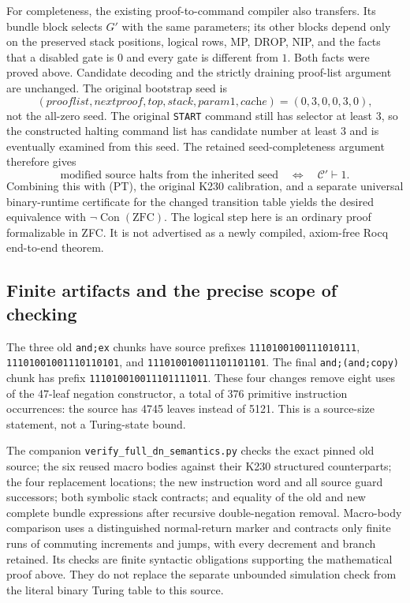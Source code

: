 For completeness, the existing proof-to-command compiler also
transfers.  Its bundle block selects $G'$ with the same parameters;
its other blocks depend only on the preserved stack positions,
logical rows, MP, DROP, NIP, and the facts that a disabled gate is
$0$ and every gate is different from $1$.  Both facts were proved
above.  Candidate decoding and the strictly draining proof-list
argument are unchanged.  The original bootstrap seed is
\[
 (\textit{prooflist},\textit{nextproof},\textit{top},
   \textit{stack},\textit{param1},\textit{cache})
       =(0,3,0,0,3,0),
\]
not the all-zero seed.  The original \texttt{START} command still
has selector at least $3$, so the constructed halting command list
has candidate number at least $3$ and is eventually examined from
this seed.  The retained seed-completeness argument therefore gives
\[
 \text{modified source halts from the inherited seed}
 \quad\Longleftrightarrow\quad \mathcal C'\vdash1.
\]
Combining this with (PT), the original K230 calibration, and a
separate universal binary-runtime certificate for the changed
transition table yields the desired equivalence with
$\neg\operatorname{Con}(\mathrm{ZFC})$.  The logical step here
is an ordinary proof formalizable in ZFC.  It is not advertised as
a newly compiled, axiom-free Rocq end-to-end theorem.

\subsection{Finite artifacts and the precise scope of checking}

The three old \texttt{and;ex} chunks have source prefixes
\nolinkurl{1110100100111010111},
\nolinkurl{11101001001110110101}, and
\nolinkurl{111010010011101101101}.  The final
\texttt{and;(and;copy)} chunk has prefix
\nolinkurl{111010010011101111011}.  These four changes remove eight
uses of the 47-leaf negation constructor, a total of 376 primitive
instruction occurrences: the source has 4745 leaves instead of 5121.
This is a source-size statement, not a Turing-state bound.

The companion \texttt{verify\_full\_dn\_semantics.py} checks the
exact pinned old source; the six reused macro bodies against their
K230 structured counterparts; the four replacement locations; the
new instruction word and all source guard successors; both symbolic
stack contracts; and equality of the old and new complete bundle
expressions after recursive double-negation removal.  Macro-body
comparison uses a distinguished normal-return marker and contracts
only finite runs of commuting increments and jumps, with every
decrement and branch retained.  Its checks are finite syntactic
obligations supporting the mathematical proof above.  They do not
replace the separate unbounded simulation check from the literal
binary Turing table to this source.
